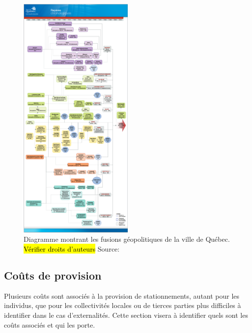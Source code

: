   \begin{figure}[!h]
    \centering
    \captionsetup{justification=centering,margin=2cm}
    \includegraphics[width = 0.5\textwidth]{images/historique_fusions_VDQ.png}
    \captionsetup{justification=centering,margin=2cm}
    \caption{Diagramme montrant les fusions géopolitiques de la ville de Québec. \hl{Vérifier droits d'auteurs} Source: \cite{VilledeQuebec:ReperesChronologique:}}
    \label{fig:historique_fusions}
  \end{figure}
  \FloatBarrier
  \subsection{Coûts de provision}
  Plusieurs coûts sont associés à la provision de stationnements, autant pour les individus, que pour les collectivités locales ou de tierces parties plus difficiles à identifier dans le cas d'externalités. Cette section visera à identifier quels sont les coûts associés et qui les porte.

